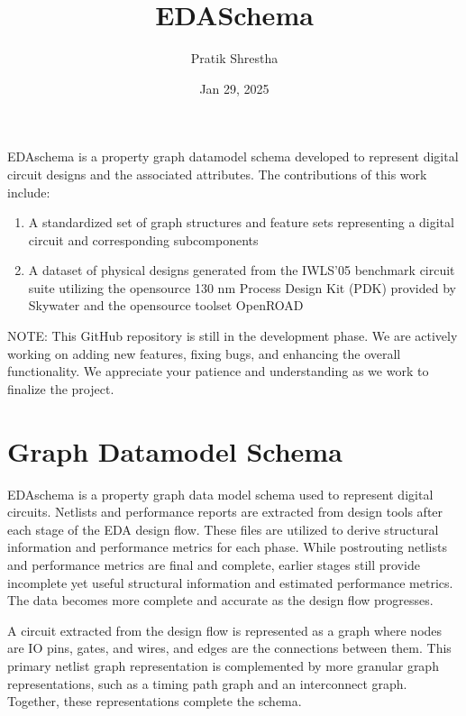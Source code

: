 \documentclass[letterpaper,10pt,english]{sphinxmanual}
\title{EDA\sphinxhyphen{}Schema}
\date{Jan 29, 2025}
\author{Pratik Shrestha}
\begin{document}
\pagestyle{empty}
\sphinxmaketitle
\pagestyle{plain}
\sphinxtableofcontents
\pagestyle{normal}
\label{\detokenize{index::doc}}


\sphinxAtStartPar
EDA\sphinxhyphen{}schema is a property graph datamodel schema developed to represent digital circuit designs and the associated attributes.
The contributions of this work include:
\begin{enumerate}
%
\item {} 
\sphinxAtStartPar
A standardized set of graph structures and feature sets representing a digital circuit and corresponding subcomponents

\item {} 
\sphinxAtStartPar
A dataset of physical designs generated from the IWLS’05 benchmark circuit suite utilizing the open\sphinxhyphen{}source 130 nm Process Design Kit (PDK) provided by Skywater and the open\sphinxhyphen{}source toolset OpenROAD

\end{enumerate}

\sphinxAtStartPar
NOTE: This GitHub repository is still in the development phase. We are actively working on adding new features, fixing bugs, and enhancing the overall functionality. We appreciate your patience and understanding as we work to finalize the project.


\chapter{Graph Datamodel Schema}
\label{\detokenize{index:graph-datamodel-schema}}
\sphinxAtStartPar
EDA\sphinxhyphen{}schema is a property graph data model schema used to represent digital circuits. Netlists and performance reports are extracted from design tools after each stage of the EDA design flow. These files are utilized to derive structural information and performance metrics for each phase. While post\sphinxhyphen{}routing netlists and performance metrics are final and complete, earlier stages still provide incomplete yet useful structural information and estimated performance metrics. The data becomes more complete and accurate as the design flow progresses.

\sphinxAtStartPar
A circuit extracted from the design flow is represented as a graph where nodes are IO pins, gates, and wires, and edges are the connections between them. This primary netlist graph representation is complemented by more granular graph representations, such as a timing path graph and an interconnect graph. Together, these representations complete the schema.
\end{document}
